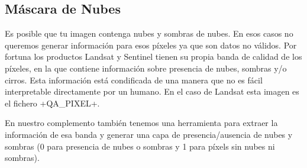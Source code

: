 \documentclass[a4paper,11pt]{article}
\begin{document}
  \subsection{Máscara de Nubes}
    Es posible que tu imagen contenga nubes y sombras de nubes. En esos casos no queremos generar información para esos píxeles ya que son datos no válidos. Por fortuna los productos Landsat y Sentinel tienen su propia banda de calidad de los píxeles, en la que contiene información sobre presencia de nubes, sombras y/o cirros. Esta información está condificada de una manera que no es fácil interpretable directamente por un humano. En el caso de Landsat esta imagen es el fichero \cverb+QA_PIXEL+.
    
    En nuestro complemento también tenemos una herramienta para extraer la información de esa banda y generar una capa de presencia/ausencia de nubes y sombras (0 para presencia de nubes o sombras y 1 para píxels sin nubes ni sombras).
    
\end{document}
